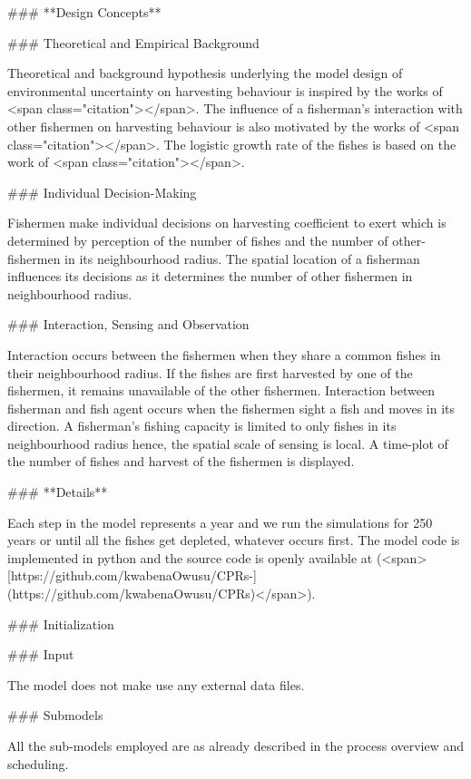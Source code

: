 ### **Design Concepts**

### Theoretical and Empirical Background

Theoretical and background hypothesis underlying the model design of environmental uncertainty on harvesting behaviour is inspired by the works of <span class="citation"></span>. The influence of a fisherman’s interaction with other fishermen on harvesting behaviour is also motivated by the works of <span class="citation"></span>. The logistic growth rate of the fishes is based on the work of <span class="citation"></span>.

### Individual Decision-Making

Fishermen make individual decisions on harvesting coefficient to exert which is determined by perception of the number of fishes and the number of other-fishermen in its neighbourhood radius. The spatial location of a fisherman influences its decisions as it determines the number of other fishermen in neighbourhood radius.

### Interaction, Sensing and Observation

Interaction occurs between the fishermen when they share a common fishes in their neighbourhood radius. If the fishes are first harvested by one of the fishermen, it remains unavailable of the other fishermen. Interaction between fisherman and fish agent occurs when the fishermen sight a fish and moves in its direction. A fisherman’s fishing capacity is limited to only fishes in its neighbourhood radius hence, the spatial scale of sensing is local. A time-plot of the number of fishes and harvest of the fishermen is displayed.

### **Details**

Each step in the model represents a year and we run the simulations for 250 years or until all the fishes get depleted, whatever occurs first. The model code is implemented in python and the source code is openly available at (<span>[https://github.com/kwabenaOwusu/CPRs-](https://github.com/kwabenaOwusu/CPRs)</span>).

### Initialization

### Input

The model does not make use any external data files.

### Submodels

All the sub-models employed are as already described in the process overview and scheduling.

